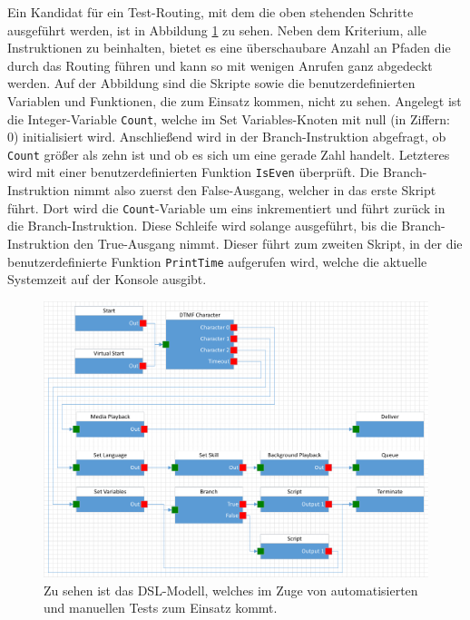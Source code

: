 Ein Kandidat für ein Test-Routing, mit dem die oben stehenden Schritte ausgeführt werden, ist in Abbildung \ref{fig:TestRouting} zu sehen. Neben dem Kriterium, alle Instruktionen zu beinhalten, bietet es eine überschaubare Anzahl an Pfaden die durch das Routing  führen und kann so mit wenigen Anrufen ganz abgedeckt werden. Auf der Abbildung sind die Skripte sowie die benutzerdefinierten Variablen und Funktionen, die zum Einsatz kommen, nicht zu sehen. Angelegt ist die Integer-Variable \texttt{Count}, welche im Set Variables-Knoten mit null (in Ziffern: 0) initialisiert wird. Anschließend wird in der Branch-Instruktion abgefragt, ob \texttt{Count} größer als zehn ist und ob es sich um eine gerade Zahl handelt. Letzteres wird mit einer benutzerdefinierten Funktion \texttt{IsEven} überprüft. Die Branch-Instruktion nimmt also zuerst den False-Ausgang, welcher in das erste Skript führt. Dort wird die \texttt{Count}-Variable um eins inkrementiert und führt zurück in die Branch-Instruktion. Diese Schleife wird solange ausgeführt, bis die Branch-Instruktion den True-Ausgang nimmt. Dieser führt zum zweiten Skript, in der die benutzerdefinierte Funktion \texttt{PrintTime} aufgerufen wird, welche die aktuelle Systemzeit auf der Konsole ausgibt.

\begin{figure} %
	\centering
		\includegraphics[width=\textwidth]{img/TestRouting.png}
	\caption[DSL-Modell für manuelle Tests]{Zu sehen ist das DSL-Modell, welches im Zuge von automatisierten und manuellen  Tests zum Einsatz kommt.}
	\label{fig:TestRouting}
\end{figure}

